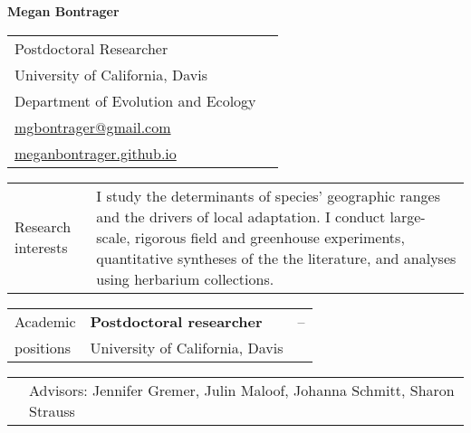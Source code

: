 \documentclass[letterpaper,11pt,oneside]{article}
\begin{document}
\thispagestyle{empty}

\noindent  \LARGE{\textbf{Megan Bontrager}} 
\smallskip
\normalsize

\noindent \begin{tabular}{@{} p{10cm} >{\raggedleft\arraybackslash}p{8.11cm}}
Postdoctoral Researcher \\
University of California, Davis & \\
Department of Evolution and Ecology & \\
{\href{mailto:mgbontrager@gmail.com}{mgbontrager@gmail.com}} & \\
{\href{https://meganbontrager.github.io}{meganbontrager.github.io}} & \\

\end{tabular}
\vspace{1em}

\noindent\hrulefill 

\bigskip
\bigskip




\noindent \begin{tabular}{@{} p{3cm} >{\raggedright}p{14.2cm}}
\Large{Research interests} & I study the determinants of species' geographic ranges and the drivers of local adaptation. I conduct large-scale, rigorous field and greenhouse experiments, quantitative syntheses of the the literature, and analyses using herbarium collections. \\
\end{tabular}
\bigskip
\bigskip




\noindent \begin{tabular}{@{} p{3cm} p{12cm} >{\raggedleft\arraybackslash}p{1.7cm}}
\Large{Academic}    & \textbf{Postdoctoral researcher} & 2018--\hspace*{0.8cm} \\
\Large{positions}   & University of California, Davis & \\
\end{tabular}

\noindent \begin{tabular}{@{} p{3cm} p{14.2cm}}
& Advisors: Jennifer Gremer, Julin Maloof, Johanna Schmitt, Sharon Strauss \\
\end{tabular}
\smallskip
\end{document}
